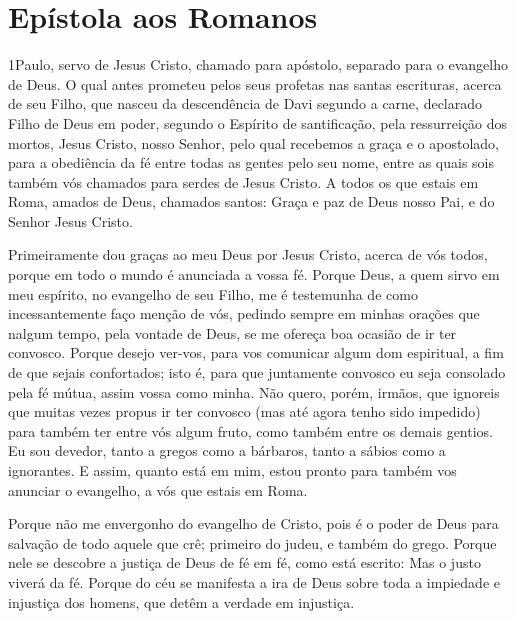 \thispagestyle{empty}
\chapter*{Epístola aos Romanos}

\lettrine{1} Paulo, servo de Jesus Cristo, chamado para
apóstolo, separado para o evangelho de Deus. O qual antes
prometeu pelos seus profetas nas santas escrituras, acerca de
seu Filho, que nasceu da descendência de Davi segundo a carne,
declarado Filho de Deus em poder, segundo o Espírito de
santificação, pela ressurreição dos mortos, Jesus Cristo, nosso
Senhor, pelo qual recebemos a graça e o apostolado, para a
obediência da fé entre todas as gentes pelo seu nome, entre as
quais sois também vós chamados para serdes de Jesus Cristo. A
todos os que estais em Roma, amados de Deus, chamados santos: Graça
e paz de Deus nosso Pai, e do Senhor Jesus Cristo.

Primeiramente dou graças ao meu Deus por Jesus Cristo, acerca de
vós todos, porque em todo o mundo é anunciada a vossa fé. Porque
Deus, a quem sirvo em meu espírito, no evangelho de seu Filho, me é
testemunha de como incessantemente faço menção de vós,
pedindo sempre em minhas orações que nalgum tempo, pela
vontade de Deus, se me ofereça boa ocasião de ir ter convosco.
Porque desejo ver-vos, para vos comunicar algum dom
espiritual, a fim de que sejais confortados; isto é, para que
juntamente convosco eu seja consolado pela fé mútua, assim vossa
como minha. Não quero, porém, irmãos, que ignoreis que muitas
vezes propus ir ter convosco (mas até agora tenho sido impedido)
para também ter entre vós algum fruto, como também entre os demais
gentios. Eu sou devedor, tanto a gregos como a bárbaros,
tanto a sábios como a ignorantes. E assim, quanto está em
mim, estou pronto para também vos anunciar o evangelho, a vós que
estais em Roma.

Porque não me envergonho do evangelho de Cristo, pois é o poder
de Deus para salvação de todo aquele que crê; primeiro do judeu, e
também do grego. Porque nele se descobre a justiça de Deus de
fé em fé, como está escrito: Mas o justo viverá da fé. Porque
do céu se manifesta a ira de Deus sobre toda a impiedade e injustiça
dos homens, que detêm a verdade em injustiça.

